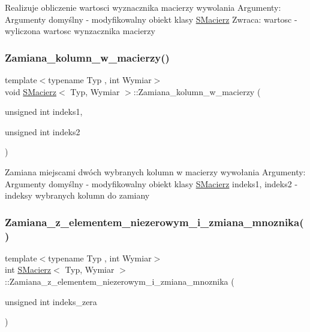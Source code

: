 Realizuje obliczenie wartosci wyznacznika macierzy wywolania Argumenty\+: Argumenty domyślny -\/ modyfikowalny obiekt klasy \hyperlink{classSMacierz}{S\+Macierz} Zwraca\+: wartosc -\/ wyliczona wartosc wynzacznika macierzy \mbox{\label{classSMacierz_afee8329b07e345879eead08f3a316f62}} 
\subsubsection{\texorpdfstring{Zamiana\+\_\+kolumn\+\_\+w\+\_\+macierzy()}{Zamiana\_kolumn\_w\_macierzy()}}
{\footnotesize\ttfamily template$<$typename Typ , int Wymiar$>$ \\
void \hyperlink{classSMacierz}{S\+Macierz}$<$ Typ, Wymiar $>$\+::Zamiana\+\_\+kolumn\+\_\+w\+\_\+macierzy (\begin{DoxyParamCaption}\item[{unsigned int}]{indeks1,  }\item[{unsigned int}]{indeks2 }\end{DoxyParamCaption})\hspace{0.3cm}{\ttfamily [private]}}

Zamiana miejscami dwóch wybranych kolumn w macierzy wywołania Argumenty\+: Argumenty domyślny -\/ modyfikowalny obiekt klasy \hyperlink{classSMacierz}{S\+Macierz} indeks1, indeks2 -\/ indeksy wybranych kolumn do zamiany \mbox{\label{classSMacierz_aceb9638a718d4e5e0a03a020b041aa0d}} 
\subsubsection{\texorpdfstring{Zamiana\+\_\+z\+\_\+elementem\+\_\+niezerowym\+\_\+i\+\_\+zmiana\+\_\+mnoznika()}{Zamiana\_z\_elementem\_niezerowym\_i\_zmiana\_mnoznika()}}
{\footnotesize\ttfamily template$<$typename Typ , int Wymiar$>$ \\
int \hyperlink{classSMacierz}{S\+Macierz}$<$ Typ, Wymiar $>$\+::Zamiana\+\_\+z\+\_\+elementem\+\_\+niezerowym\+\_\+i\+\_\+zmiana\+\_\+mnoznika (\begin{DoxyParamCaption}\item[{unsigned int}]{indeks\+\_\+zera }\end{DoxyParamCaption})\hspace{0.3cm}{\ttfamily [private]}}

